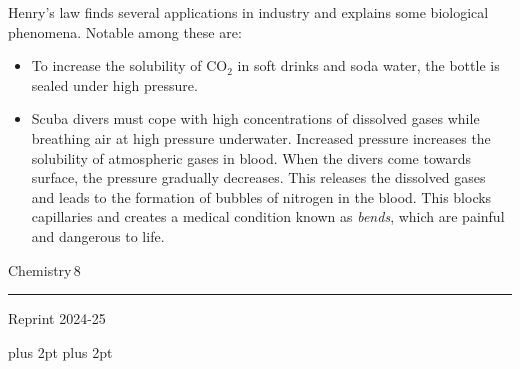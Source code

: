 \documentclass[11pt,a4paper]{article}
\renewcommand{\normalsize}{\fontsize{10.5bp}{12.7bp}\selectfont\abovedisplayskip=4pt plus 2pt\belowdisplayskip=4pt plus 2pt\abovedisplayshortskip=2pt\belowdisplayshortskip=2pt}
\begin{document}
\vspace{10pt}
\noindent\hfill\begin{minipage}[t]{0.735\textwidth}
\hspace*{1.5em}Henry's law finds several applications in industry and explains some biological phenomena. Notable among these are:
\begin{itemize}[leftmargin=14pt,itemsep=3pt,topsep=2pt,label=\textbullet]
\item To increase the solubility of CO$_2$ in soft drinks and soda water, the bottle is sealed under high pressure.
\item Scuba divers must cope with high concentrations of dissolved gases while breathing air at high pressure underwater. Increased pressure increases the solubility of atmospheric gases in blood. When the divers come towards surface, the pressure gradually decreases. This releases the dissolved gases and leads to the formation of bubbles of nitrogen in the blood. This blocks capillaries and creates a medical condition known as \textit{bends}, which are painful and dangerous to life.
\end{itemize}
\end{minipage}

\vfill
\noindent\begin{minipage}{0.3\textwidth}
{\color{gray}Chemistry}\hspace{6pt}\colorbox{Goldenrod1}{\color{gray}\,8\,}\\[-6pt]
{\color{Goldenrod1}\rule{\linewidth}{1pt}}
\end{minipage}
\begin{center}
{\sffamily\small Reprint 2024-25}
\end{center}

\normalsize

\end{document}
